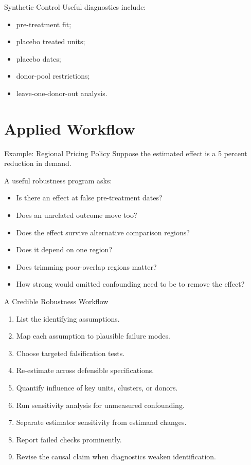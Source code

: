 \documentclass[aspectratio=169,11pt]{beamer}
\begin{document}
\begin{frame}{Synthetic Control}
Useful diagnostics include:
\begin{itemize}
\item pre-treatment fit;
\item placebo treated units;
\item placebo dates;
\item donor-pool restrictions;
\item leave-one-donor-out analysis.
\end{itemize}
\end{frame}

\section{Applied Workflow}

\begin{frame}{Example: Regional Pricing Policy}
Suppose the estimated effect is a 5 percent reduction in demand.

A useful robustness program asks:
\begin{itemize}
\item Is there an effect at false pre-treatment dates?
\item Does an unrelated outcome move too?
\item Does the effect survive alternative comparison regions?
\item Does it depend on one region?
\item Does trimming poor-overlap regions matter?
\item How strong would omitted confounding need to be to remove the effect?
\end{itemize}
\end{frame}

\begin{frame}{A Credible Robustness Workflow}
\begin{enumerate}
\item List the identifying assumptions.
\item Map each assumption to plausible failure modes.
\item Choose targeted falsification tests.
\item Re-estimate across defensible specifications.
\item Quantify influence of key units, clusters, or donors.
\item Run sensitivity analysis for unmeasured confounding.
\item Separate estimator sensitivity from estimand changes.
\item Report failed checks prominently.
\item Revise the causal claim when diagnostics weaken identification.
\end{enumerate}
\end{frame}
\end{document}
